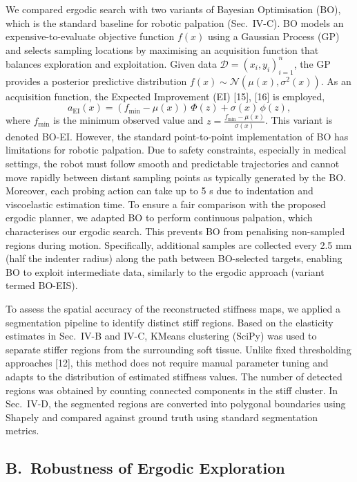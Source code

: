 \documentclass[11pt]{article}
\begin{document}
We compared ergodic search with two variants of Bayesian Optimisation
(BO), which is the standard baseline for robotic palpation
(Sec.~IV-C). BO models an expensive-to-evaluate objective function
$f(x)$ using a Gaussian Process (GP) and selects sampling locations
by maximising an acquisition function that balances exploration and
exploitation. Given data
$\mathcal{D} = (x_{i}, y_{i})_{i=1}^{n}$,
the GP provides a posterior predictive distribution
$f(x) \sim \mathcal{N}(\mu(x), \sigma^{2}(x))$. As an acquisition
function, the Expected Improvement (EI) [15], [16] is employed,
\[
a_{\mathrm{EI}}(x) =
(f_{\min} - \mu(x))\,\Phi(z) + \sigma(x)\,\phi(z),
\]
where $f_{\min}$ is the minimum observed value and
$z = \frac{f_{\min} - \mu(x)}{\sigma(x)}$. This variant is denoted
BO-EI. However, the standard point-to-point implementation of BO has
limitations for robotic palpation. Due to safety constraints,
especially in medical settings, the robot must follow smooth and
predictable trajectories and cannot move rapidly between distant
sampling points as typically generated by the BO. Moreover, each
probing action can take up to 5 s due to indentation and viscoelastic
estimation time. To ensure a fair comparison with the proposed
ergodic planner, we adapted BO to perform continuous palpation, which
characterises our ergodic search. This prevents BO from penalising
non-sampled regions during motion. Specifically, additional samples
are collected every 2.5 mm (half the indenter radius) along the path
between BO-selected targets, enabling BO to exploit intermediate
data, similarly to the ergodic approach (variant termed BO-EIS).

To assess the spatial accuracy of the reconstructed stiffness maps,
we applied a segmentation pipeline to identify distinct stiff
regions. Based on the elasticity estimates in Sec.~IV-B and IV-C,
KMeans clustering (SciPy) was used to separate stiffer regions from
the surrounding soft tissue. Unlike fixed thresholding approaches
[12], this method does not require manual parameter tuning and
adapts to the distribution of estimated stiffness values. The number
of detected regions was obtained by counting connected components in
the stiff cluster. In Sec.~IV-D, the segmented regions are converted
into polygonal boundaries using Shapely and compared against ground
truth using standard segmentation metrics.

\subsection*{B.\ Robustness of Ergodic Exploration}
\end{document}
